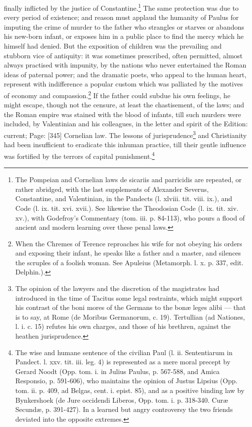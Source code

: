 finally inflicted by the justice of Constantine.\footnote{The Pompeian and Cornelian laws de sicariis and parricidis are repeated, or rather abridged, with the last supplements of Alexander Severus, Constantine, and Valentinian, in the Pandects (l. xlviii. tit. viii. ix.), and Code (l. ix. tit. xvi. xvii.). See likewise the Theodosian Code (l. ix. tit. xiv. xv.), with Godefroy\texthebrew{}’s Commentary (tom. iii. p. 84-113), who pours a flood of ancient and modern learning over these penal laws.} The same protection was due to every period of existence; and reason must applaud the humanity of Paulus for imputing the crime of murder to the father who strangles or starves or abandons his new-born infant, or exposes him in a public place to find the mercy which he himself had denied. But the exposition of children was the prevailing and stubborn vice of antiquity: it was sometimes prescribed, often permitted, almost always practised with impunity, by the nations who never entertained the Roman ideas of paternal power; and the dramatic poets, who appeal to the human heart, represent with indifference a popular custom which was palliated by the motives of economy and compassion.\footnote{When the Chremes of Terence reproaches his wife for not obeying his orders and exposing their infant, he speaks like a father and a master, and silences the scruples of a foolish woman. See Apuleius (Metamorph. l. x. p. 337, edit. Delphin.).} If the father could subdue his own feelings, he might escape, though not the censure, at least the chastisement, of the laws; and the Roman empire was stained with the blood of infants, till such murders were included, by Valentinian and his colleagues, in the letter and spirit of the Edition: current; Page: [345] Cornelian law. The lessons of jurisprudence\footnote{The opinion of the lawyers and the discretion of the magistrates had introduced in the time of Tacitus some legal restraints, which might support his contrast of the boni mores of the Germans to the bonæ leges alibi \texthebrew{—} that is to say, at Rome (de Moribus Germanorum, c. 19). Tertullian (ad Nationes, l. i. c. 15) refutes his own charges, and those of his brethren, against the heathen jurisprudence.} and Christianity had been insufficient to eradicate this inhuman practice, till their gentle influence was fortified by the terrors of capital punishment.\footnote{The wise and humane sentence of the civilian Paul (l. ii. Sententiarum in Pandect. l. xxv. tit. iii. leg. 4) is represented as a mere moral precept by Gerard Noodt (Opp. tom. i. in Julius Paulus, p. 567-588, and Amica Responsio, p. 591-606), who maintains the opinion of Justus Lipsius (Opp. tom. ii. p. 409, ad Belgas, cent. i. epist. 85), and as a positive binding law by Bynkershoek (de Jure occidendi Liberos, Opp. tom. i. p. 318-340. Curæ Secundæ, p. 391-427). In a learned but angry controversy the two friends deviated into the opposite extremes.}

